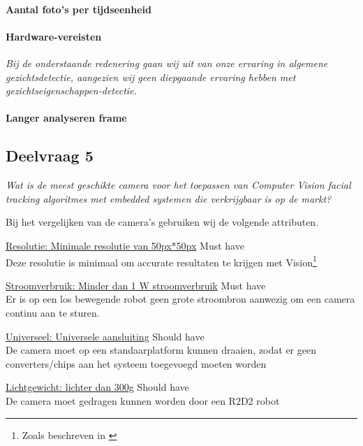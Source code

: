 \documentclass[11pt]{article}
\begin{document}
    \paragraph{Aantal foto's per tijdseenheid}

    \paragraph{Hardware-vereisten}

    \emph{Bij de onderstaande redenering gaan wij uit van onze ervaring in algemene gezichtsdetectie, aangezien wij geen diepgaande ervaring hebben met gezichtseigenschappen-detectie.}

    \paragraph{Langer analyseren frame}

    \subsection{Deelvraag 5 }\label{subsec:deelvraag-5}
    \emph{Wat is de meest geschikte camera voor het toepassen van Computer Vision facial tracking algoritmes met embedded systemen die verkrijgbaar is op de markt?}

    Bij het vergelijken van de camera's gebruiken wij de volgende attributen.

    \vspace{1em}

    \noindent \underline{Resolutie: Minimale resolutie van 50px*50px} \hfill Must have\\
    Deze resolutie is minimaal om accurate resultaten te krijgen met Vision\footnote{Zoals beschreven in \citet{boom2006effect}}

    \noindent \underline{Stroomverbruik: Minder dan 1 W stroomverbruik} \hfill Must have\\
    Er is op een los bewegende robot geen grote stroombron aanwezig om een camera continu aan te sturen.

    \noindent \underline{Universeel: Universele aansluiting} \hfill Should have\\
    De camera moet op een standaarplatform kunnen draaien, zodat er geen converters/chips aan het systeem toegevoegd moeten worden

    \noindent \underline{Lichtgewicht: lichter dan 300g} \hfill Should have\\
    De camera moet gedragen kunnen worden door een R2D2 robot
\end{document}
